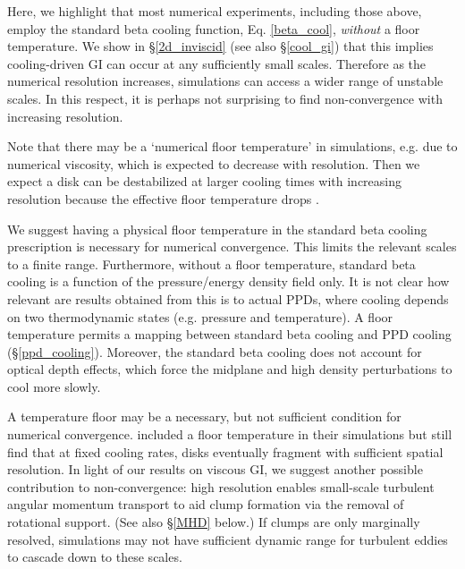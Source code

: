 Here, we highlight that most numerical experiments, including those
above, employ the standard beta cooling function, Eq. \ref{beta_cool},
\emph{without} a floor temperature. We show in \S\ref{2d_inviscid}
(see also \S\ref{cool_gi}) that this implies cooling-driven GI can
occur at any sufficiently small scales. Therefore as the numerical
resolution increases, simulations can access a wider range of unstable
scales.  %
In this respect, it is perhaps not surprising to find non-convergence with 
increasing resolution. %

Note that there may be a `numerical floor temperature' in 
simulations, e.g. due to numerical viscosity, which is expected to 
decrease with resolution. Then we expect a disk can be
destabilized at larger cooling times with increasing resolution
because the effective floor temperature drops   
\citep[cf.][see also Fig. \ref{invisc_theta}]{meru11}. 

We suggest having a physical floor temperature in the standard beta
cooling prescription is  necessary for  
numerical convergence. This limits the
relevant scales to a finite range.  %
Furthermore, without a floor temperature, standard beta cooling is
a function of the pressure/energy density field only. It is not clear
how relevant are results obtained from this is to actual PPDs,
where cooling depends on two thermodynamic states (e.g. pressure and
temperature). A floor temperature permits a mapping between standard beta
cooling and PPD cooling (\S\ref{ppd_cooling}). 
Moreover, the standard beta cooling does 
not account for optical depth effects, which force the midplane 
and high density perturbations to cool more slowly.

%


A temperature floor may be a necessary, but not sufficient condition
for numerical convergence. \cite{baehr15} included a floor temperature 
in their simulations but still find that at fixed cooling rates, disks
eventually fragment with sufficient spatial resolution.
In light of our results on viscous GI, 
we suggest another possible contribution to non-convergence: %
high resolution enables small-scale turbulent angular momentum transport 
to aid clump formation via the removal of rotational support. (See also \S\ref{MHD} below.) 
If clumps are only marginally resolved, simulations may not have sufficient dynamic range for turbulent eddies
to cascade down to these scales.

